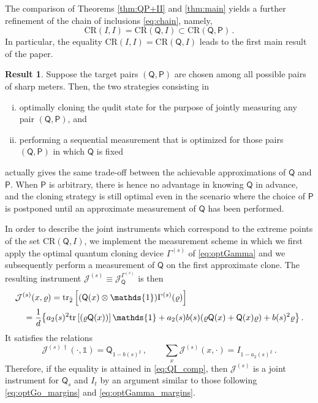 \documentclass[12pt,reqno]{amsart}
\theoremstyle{definition}
\newcommand{\tr}[1]{{\rm tr}\left[#1\right]} %
\newcommand{\ptr}[2]{{\rm tr}_{#1} #2} %
\newcommand{\id}{\mathds{1}} %
\newcommand{\Qo}{\mathsf{Q}}%
\newcommand{\Po}{\mathsf{P}}%
\newtheorem{result}{Result}
\newcommand{\rhoo}{\varrho} %
\newcommand{\ii}{\mathcal{J}}
\newcommand{\CR}[1]{\textrm{CR} #1} %
\begin{document}
The comparison of Theorems \ref{thm:QP+II} and \ref{thm:main} yields a further refinement of the chain of inclusions \eqref{eq:chain}, namely,
\begin{equation} %
\CR{(I, I)} = \CR{(\Qo, I)} \subset \CR{(\Qo,\Po)} \, .
\end{equation}
In particular, the equality $\CR{(I, I)} = \CR{(\Qo, I)}$ leads to the first main result of the paper.

\begin{result}\label{res:1}
Suppose the target pairs $(\Qo,\Po)$ are chosen among all possible pairs of sharp meters. Then, the two strategies consisting in
\begin{enumerate}[(i)]
\item optimally cloning the qudit state for the purpose of jointly measuring any pair $(\Qo,\Po)$, and
\item performing a sequential measurement that is optimized for those pairs $(\Qo,\Po)$ in which $\Qo$ is fixed
\end{enumerate}
actually gives the same trade-off between the achievable approximations of $\Qo$ and $\Po$. When $\Po$ is arbitrary, there is hence no advantage in knowing $\Qo$ in advance, and the cloning strategy is still optimal even in the scenario where the choice of $\Po$ is postponed until an approximate measurement of $\Qo$ has been performed.
\end{result}

In order to describe the joint instruments which correspond to the extreme points of the set $\CR{(\Qo,I)}$, we implement the measurement scheme in which we first apply the optimal quantum cloning device $\Gamma^{(s)}$ of \eqref{eq:optGamma} and we subsequently perform a measurement of $\Qo$ on the first approximate clone. The resulting instrument $\ii^{(s)} \equiv \ii^{\Gamma^{(s)}}_\Qo$ is then
\begin{equation}\label{eq:optJ}
\begin{aligned}
& \ii^{(s)}(x,\rhoo) = \ptr{\bar{2}}{\left[(\Qo(x)\otimes\id)\Gamma^{(s)}(\rhoo)\right]} \\
& \quad = \frac{1}{d} \big\{ a_2(s)^2 \tr{(\rhoo\Qo(x))} \id + a_2(s)b(s) (\rhoo\Qo(x) + \Qo(x)\rhoo) + b(s)^2 \rhoo \big\} \,.
\end{aligned}
\end{equation}
It satisfies the relations
\begin{equation} %
\ii^{(s)\,\dag}(\cdot,\id) = \Qo_{1-b(s)^2}\,,\qquad \sum_x \ii^{(s)}(x,\cdot) = I_{1-a_2(s)^2}\,.
\end{equation}
Therefore, if the equality is attained in \eqref{eq:QI_comp}, then $\ii^{(s)}$ is a joint instrument for $\Qo_s$ and $I_t$ by an argument similar to those following \eqref{eq:optGo_margins} and \eqref{eq:optGamma_margins}.
\end{document}
